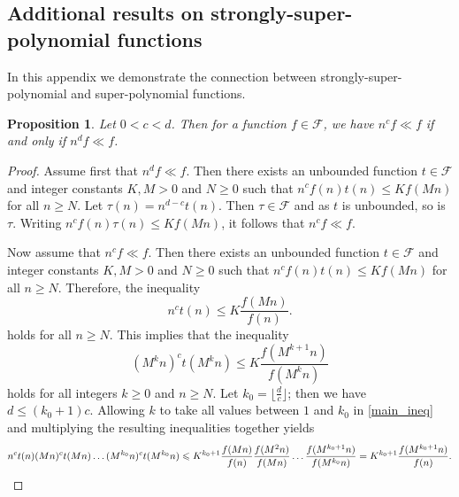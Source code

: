 \documentclass[11pt]{amsart}
\newtheorem{proposition}[theorem]{Proposition}
\theoremstyle{definition}
\renewcommand{\geq}{\geqslant} \renewcommand{\leq}{\leqslant} \renewcommand{\ge}{\geqslant} \renewcommand{\le}{\leqslant}
\begin{document}
\begin{appendix}
\section{Additional results on strongly-super-polynomial functions}


In this appendix we demonstrate the connection between strongly-super-polynomial and super-polynomial functions.

 \begin{proposition}
 \label{prop:strongSuper}	
    Let $0< c < d$. Then for a function $f \in \mathcal{F}$, we have
    $n^{c} f \ll f$ if and only if $n^{d} f \ll f$.
 \end{proposition}
 \begin{proof}
    Assume first that $n^{d} f \ll f$. Then there exists
    an unbounded function $t \in \mathcal{F}$ and integer constants $K,M>0$ and $N \geqslant 0$
    such that
    $n^{c} f(n) t(n) \leq K f (Mn)$ for all
    $n \geq N$.
    Let $\tau  (n)= n^{d-c} t(n)$. Then $\tau \in \mathcal{F}$ and as $t$ is unbounded, so is $\tau$. Writing
    $n^{c} f(n) \tau(n)\leq K f (Mn)$, it follows that
    $n^{c} f \ll f$.

    Now assume that $n^{c} f \ll f$. Then there exists
    an unbounded function $t \in \mathcal{F}$ and
    integer constants $K,M>0$ and $N \geqslant 0$
    such that
    $n^{c} f(n) t(n) \leqslant K f (Mn)$ for all
    $n \geqslant N$. Therefore, the inequality
    \begin{equation*}
        n^{c} t (n) \leqslant K \frac{f(Mn)}{f(n)}.
    \end{equation*}
    holds for all $n \geqslant N$. This implies that
    the inequality
    \begin{equation}
    \label{main_ineq}
       (M^k n)^{c} t(M^k n) \leqslant K \frac{f(M^{k+1}n)}
       {f(M^{k}n)}
    \end{equation}
    holds for all integers $k \geqslant 0$ and $n \geqslant N$.
    Let $k_0 = \lfloor \frac{d}{c}\rfloor$; then we have
    $d \leqslant (k_0+1) c$.
    Allowing $k$ to take all values between $1$ and $k_0$ in \eqref{main_ineq} and multiplying the resulting inequalities together yields
    \begin{dmath*}
    \label{main_ineq2}
        n^{c} t(n) (M n)^{c} t(M n) \dots
       (M^{k_0} n)^{c} t(M^{k_0} n)
       \nonumber \\\leq
       K^{k_0+1} \frac{f(Mn)}{f(n)} \frac{f(M^2 n)}{f(M n)}
       \dots \frac{f(M^{k_0+1}n)}{f(M^{k_0}n)}
       =
       K^{k_0 +1}  \frac{f(M^{k_0 +1}n)}{f(n)}.
    \end{dmath*}






\end{proof}
\end{appendix}
\end{document}
